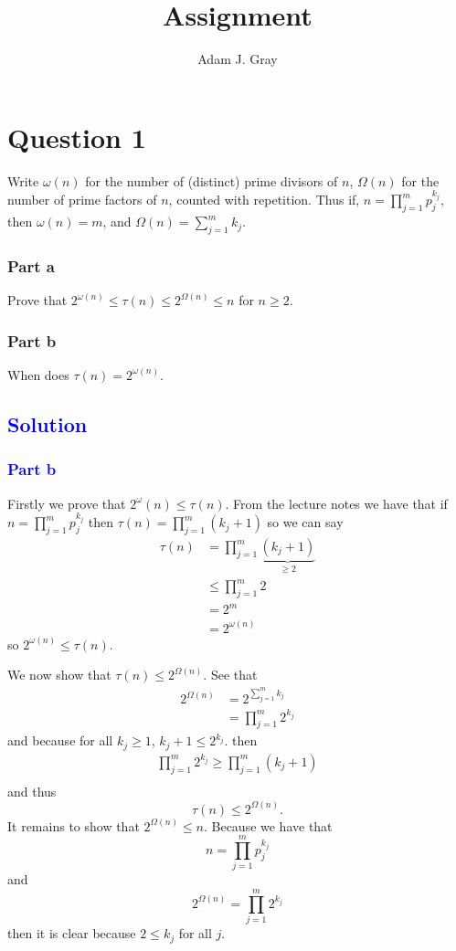 \documentclass{unswmaths}
\begin{document}
\author{Adam J. Gray}
\subject{Number Theory}
\title{Assignment}

\unswtitle

\section*{Question 1}
Write $ \omega(n) $ for the number of (distinct) prime divisors of $ n $, 
$ \Omega(n) $ for the number of prime factors of $ n $, counted with 
repetition. Thus if, $ n = \prod_{j=1}^m p_j^{k_j} $, then $ \omega(n) = m $,
and $ \Omega(n) = \sum_{j=1}^{m} k_j $.
\subsubsection*{Part a}
Prove that $ 2^{\omega(n)} \leq \tau(n) \leq 2^{\Omega(n)} \leq n $ for 
$ n \geq 2 $.
\subsubsection*{Part b}
When does $ \tau(n) = 2^{\omega(n)} $.

\hrulefill

\subsection*{\textcolor{blue}{Solution}}
\subsubsection*{\textcolor{blue}{Part b}}
Firstly we prove that $ 2^\omega(n) \leq \tau(n) $. 
From the lecture notes we have that if $ n = \prod_{j=1}^m p_j^{k_j} $
then $ \tau(n) = \prod^{m}_{j=1}(k_j + 1) $ so we can say
\begin{align}
	\tau(n) 	&= \prod^{m}_{j=1}\underbrace{(k_j + 1)}_{\geq 2} \nonumber \\
				\label{ineq:qn1a}
				&\leq \prod^{m}_{j=1} 2 \\
				&= 2^m \nonumber \\
				&= 2^{\omega(n)} \nonumber
\end{align}
so $ 2^{\omega(n)} \leq \tau(n) $.

We now show that $ \tau(n) \leq 2^{\Omega(n)} $.
See that 
\begin{align*}
	2^{\Omega(n)} 	&= 2^{\sum_{j=1}^{m} k_j} \\
					&= \prod_{j=1}^{m}2^{k_j}
\end{align*}
and because for all $ k_j \geq 1 $, $ k_j + 1 \leq 2^{k_j} $.
then
\begin{align*}
	\prod_{j=1}^{m}2^{k_j}	\geq \prod_{j=1}^{m} (k_j + 1) \\
\end{align*}
and thus 
$$
	\tau(n) \leq 2^{\Omega(n)}.
$$
It remains to show that $ 2^{\Omega(n)} \leq n $.
Because we have that $$ n = \prod_{j=1}^m p_j^{k_j} $$ and $$ 2^{\Omega(n)} = \prod_{j=1}^{m}2^{k_j} $$
then it is clear because $ 2 \leq k_j $ for all $ j $. 
\end{document}
